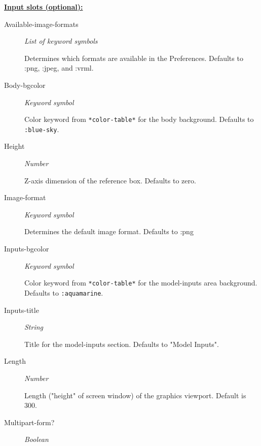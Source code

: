\documentclass [11pt]{book}
\begin{document}
\begin{itemize}
\textbf{
\underline{Input slots (optional):}}

\begin{description}

\item [Available-image-formats]
\emph{List of keyword symbols}

 Determines which formats are available in the Preferences. Defaults to :png, :jpeg, and :vrml.




\item [Body-bgcolor]
\emph{Keyword symbol}

 Color keyword from \texttt{*color-table*} for the body background. Defaults to \texttt{:blue-sky}.




\item [Height]
\emph{Number}

 Z-axis dimension of the reference box. Defaults to zero.




\item [Image-format]
\emph{Keyword symbol}

 Determines the default image format. Defaults to :png




\item [Inputs-bgcolor]
\emph{Keyword symbol}

 Color keyword from \texttt{*color-table*} for the model-inputs area background. Defaults to \texttt{:aquamarine}.




\item [Inputs-title]
\emph{String}

 Title for the model-inputs section. Defaults to "Model Inputs".




\item [Length]
\emph{Number}

 Length ("height" of screen window) of the graphics viewport. Default is 300.




\item [Multipart-form?]
\emph{Boolean}


\end{description}
\end{itemize}
\end{document}
